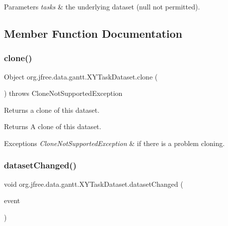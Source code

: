 \begin{DoxyParams}{Parameters}
{\em tasks} & the underlying dataset ({\ttfamily null} not permitted). \\
\hline
\end{DoxyParams}


\subsection{Member Function Documentation}
\mbox{\label{classorg_1_1jfree_1_1data_1_1gantt_1_1_x_y_task_dataset_ad283469621732008b8c21df49957f7e1}} 
\subsubsection{\texorpdfstring{clone()}{clone()}}
{\footnotesize\ttfamily Object org.\+jfree.\+data.\+gantt.\+X\+Y\+Task\+Dataset.\+clone (\begin{DoxyParamCaption}{ }\end{DoxyParamCaption}) throws Clone\+Not\+Supported\+Exception}

Returns a clone of this dataset.

\begin{DoxyReturn}{Returns}
A clone of this dataset.
\end{DoxyReturn}

\begin{DoxyExceptions}{Exceptions}
{\em Clone\+Not\+Supported\+Exception} & if there is a problem cloning. \\
\hline
\end{DoxyExceptions}
\mbox{\label{classorg_1_1jfree_1_1data_1_1gantt_1_1_x_y_task_dataset_ac1eea7e4ceef30a38ca3001991648347}} 
\subsubsection{\texorpdfstring{dataset\+Changed()}{datasetChanged()}}
{\footnotesize\ttfamily void org.\+jfree.\+data.\+gantt.\+X\+Y\+Task\+Dataset.\+dataset\+Changed (\begin{DoxyParamCaption}\item[{\mbox{\hyperlink{classorg_1_1jfree_1_1data_1_1general_1_1_dataset_change_event}{Dataset\+Change\+Event}}}]{event }\end{DoxyParamCaption})}

